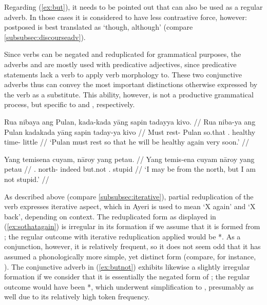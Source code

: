 \xe

Regarding (\ref{ex:but}), it needs to be pointed out that  
can also be used as a regular adverb. In those cases it is considered to have 
less contrastive force, however: postposed  is best 
translated as `though, although' (compare \autoref{subsubsec:discourseadv}).

Since verbs can be negated and reduplicated for grammatical purposes, the
adverbs  and  are mostly used with predicative adjectives, since predicative statements
lack a verb to apply verb morphology to. These two conjunctive adverbs thus can
convey the most important distinctions otherwise expressed by the verb as a
substitute. This ability, however, is not a productive grammatical process, but
specific to  and , respectively.

\pex
\a\label{ex:sothatagain}\begingl
	\gla Rua nibaya ang Pulan, kada-kada yāng sapin tadayya kivo. //
	\glb Rua niba-ya ang Pulan kada\til{}kada yāng sapin taday-ya kivo //
	\glc Must rest-\TsgM{} \Aarg{} Pulan \Iter{}\til{}so.that 
		\TsgM{}.\Aarg{} healthy time-\Loc{} little //
	\glft `Pulan must rest so that he will be healthy again very soon.' //
\endgl

\a\label{ex:butnot}\begingl
	\gla Yang temisena cuyam, nāroy yang petau. //
	\glb Yang temis-ena cuyam nāroy yang petau //
	\glc \Fsg{}.\Aarg{} north-\Gen{} indeed but.not \Fsg{}.\Aarg{} stupid //
	\glft `I may be from the north, but I am not stupid.' //
\endgl

\xe

As described above (compare \autoref{subsubsec:iterative}), partial
reduplication of the verb expresses iterative aspect, which in Ayeri is used to
mean `X again' and `X back', depending on context. The reduplicated form
 as displayed in (\ref{ex:sothatagain}) is irregular in 
its formation if we assume that it is formed from ; the regular outcome with iterative reduplication applied would be 
*. As a conjunction, however, it is relatively 
frequent, so it does not seem odd that it has assumed a phonologically more 
simple, yet distinct form (compare, for instance, 
\cite[11--12]{bybeehopper2001b}). The conjunctive adverb in (\ref{ex:butnot}) 
exhibits likewise a slightly irregular formation if we consider that it is 
essentially the negated form of ; the regular outcome 
would have been *, which underwent simplification to 
, presumably as well due to its relatively high token 
frequency.

